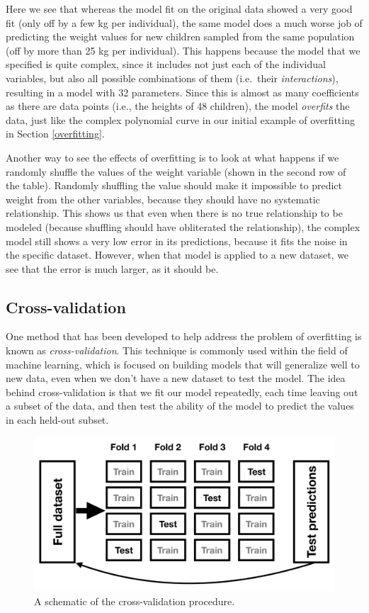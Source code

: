 \documentclass[12pt,]{book}
\theoremstyle{definition}
\theoremstyle{definition}
\theoremstyle{definition}
\theoremstyle{remark}
\begin{document}
Here we see that whereas the model fit on the original data showed a very good fit (only off by a few kg per individual), the same model does a much worse job of predicting the weight values for new children sampled from the same population (off by more than 25 kg per individual). This happens because the model that we specified is quite complex, since it includes not just each of the individual variables, but also all possible combinations of them (i.e.~their \emph{interactions}), resulting in a model with 32 parameters. Since this is almost as many coefficients as there are data points (i.e., the heights of 48 children), the model \emph{overfits} the data, just like the complex polynomial curve in our initial example of overfitting in Section \ref{overfitting}.

Another way to see the effects of overfitting is to look at what happens if we randomly shuffle the values of the weight variable (shown in the second row of the table). Randomly shuffling the value should make it impossible to predict weight from the other variables, because they should have no systematic relationship. This shows us that even when there is no true relationship to be modeled (because shuffling should have obliterated the relationship), the complex model still shows a very low error in its predictions, because it fits the noise in the specific dataset. However, when that model is applied to a new dataset, we see that the error is much larger, as it should be.

\hypertarget{cross-validation}{%
\subsection{Cross-validation}\label{cross-validation}}

One method that has been developed to help address the problem of overfitting is known as \emph{cross-validation}. This technique is commonly used within the field of machine learning, which is focused on building models that will generalize well to new data, even when we don't have a new dataset to test the model. The idea behind cross-validation is that we fit our model repeatedly, each time leaving out a subset of the data, and then test the ability of the model to predict the values in each held-out subset.

\begin{figure}
\includegraphics[width=45.74in,height=0.3\textheight]{images/crossvalidation} \caption{A schematic of the  cross-validation procedure.}\label{fig:crossvalidation}
\end{figure}
\end{document}

